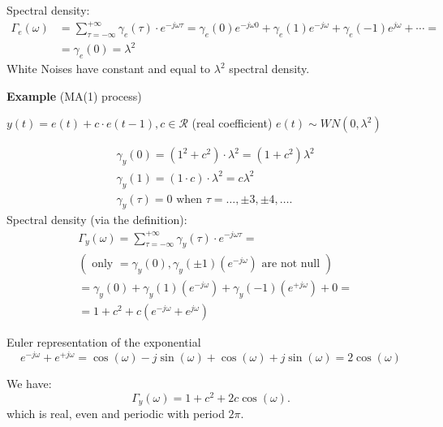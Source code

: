 Spectral density:
$$
\begin{aligned}
	\Gamma_{e}(\omega) &=\sum_{\tau=-\infty}^{+\infty} \gamma_{e}(\tau) \cdot e^{-j \omega \tau}=\gamma_{e}(0) e^{-j \omega 0}+\gamma_{e}(1) e^{-j \omega}+\gamma_{e}(-1) e^{j \omega}+\cdots=\\
	&=\gamma_{e}(0)=\lambda^{2}
\end{aligned}
$$
White Noises have constant and equal to $\lambda^{2}$ spectral density.

\textbf{Example} (MA(1) process)

$y(t)=e(t)+c \cdot e(t-1), c \in \mathcal{R}$ (real coefficient)
$e(t)\sim W N(0,\lambda^{2} )$

\begin{align*}
	&\gamma_{y}(0)=\left(1^{2}+c^{2}\right) \cdot \lambda^{2}=(1+c^{2})\lambda^{2}\\
	&\gamma_{y}(1)=(1 \cdot c) \cdot \lambda^{2}=c\lambda^{2} \\
	&\gamma_{y}(\tau)=0 \text { when } \tau=\ldots, \pm 3, \pm 4, \ldots .
\end{align*}
Spectral density (via the definition):
\begin{align*}
	&\Gamma_{y}(\omega)=\sum_{\tau=-\infty}^{+\infty} \gamma_{y}(\tau) \cdot e^{-j \omega \tau}= \\
	&\left(\text { only }=\gamma_{y}(0), \gamma_{y}(\pm 1)\left(e^{-j \omega}\right) \text { are not null }\right) \\
	&=\gamma_{y}(0)+\gamma_{y}(1)\left(e^{-j \omega}\right)+\gamma_{y}(-1)\left(e^{+j \omega}\right)+0= \\
	&=1+c^{2}+c\left(e^{-j \omega}+e^{j \omega}\right)
\end{align*}

Euler representation of the exponential
$$
e^{-j \omega}+e^{+j \omega}=\cos (\omega)-j \sin (\omega)+\cos (\omega)+j \sin (\omega)=2 \cos (\omega)
$$

We have:
$$\Gamma_y(\omega)=1+c^{2}+2 c \cos (\omega).$$
which is real, even and periodic with period $2 \pi$.